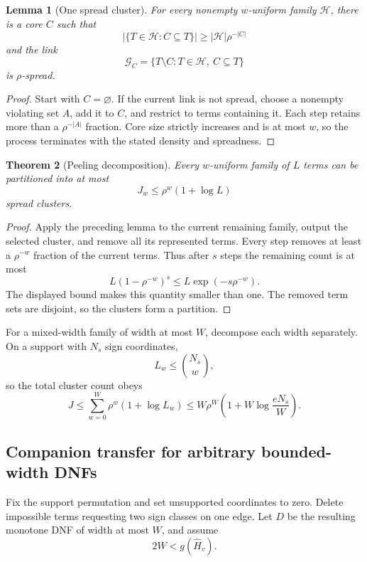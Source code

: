 \documentclass[11pt]{article}
\newtheorem{theorem}{Theorem}
\newtheorem{lemma}[theorem]{Lemma}
\begin{document}
\begin{lemma}[One spread cluster]
For every nonempty $w$-uniform family $\mathcal H$, there is a core $C$ such that
\[
|\{T\in\mathcal H:C\subseteq T\}|\ge |\mathcal H|\rho^{-|C|}
\]
and the link
\[
\mathcal G_C=\{T\setminus C:T\in\mathcal H,\ C\subseteq T\}
\]
is $\rho$-spread.
\end{lemma}
\begin{proof}
Start with $C=\varnothing$. If the current link is not spread, choose a nonempty violating set $A$, add it to $C$, and restrict to terms containing it. Each step retains more than a $\rho^{-|A|}$ fraction. Core size strictly increases and is at most $w$, so the process terminates with the stated density and spreadness.
\end{proof}

\begin{theorem}[Peeling decomposition]
Every $w$-uniform family of $L$ terms can be partitioned into at most
\[
\boxed{J_w\le \rho^w(1+\log L)}
\]
spread clusters.
\end{theorem}
\begin{proof}
Apply the preceding lemma to the current remaining family, output the selected cluster, and remove all its represented terms. Every step removes at least a $\rho^{-w}$ fraction of the current terms. Thus after $s$ steps the remaining count is at most
\[
L(1-\rho^{-w})^s\le L\exp(-s\rho^{-w}).
\]
The displayed bound makes this quantity smaller than one. The removed term sets are disjoint, so the clusters form a partition.
\end{proof}

For a mixed-width family of width at most $W$, decompose each width separately. On a support with $N_s$ sign coordinates,
\[
L_w\le\binom{N_s}{w},
\]
so the total cluster count obeys
\[
J\le\sum_{w=0}^W\rho^w(1+\log L_w)
\le W\rho^W\left(1+W\log\frac{eN_s}{W}\right).
\]

\subsection{Companion transfer for arbitrary bounded-width DNFs}
Fix the support permutation and set unsupported coordinates to zero. Delete impossible terms requesting two sign classes on one edge. Let $D$ be the resulting monotone DNF of width at most $W$, and assume
\[
2W<g(\widehat H_v).
\]
\end{document}
